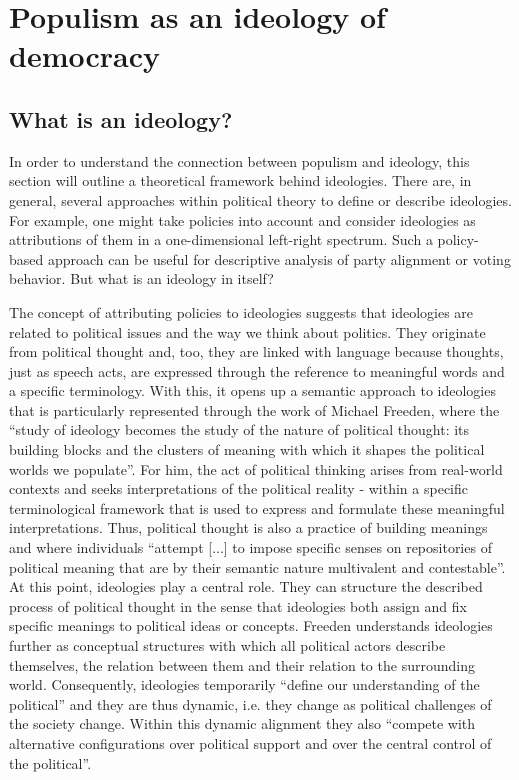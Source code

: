 \documentclass[a4paper]{scrreprt}
\begin{document}
\chapter{Populism as an ideology of democracy}
\section{What is an ideology?}
In order to understand the connection between populism and ideology, this section will outline a theoretical framework behind ideologies. There are, in general, several approaches within political theory to define or describe ideologies. For example, one might take policies into account and consider ideologies as attributions of them in a one-dimensional left-right spectrum. Such a policy-based approach can be useful for descriptive analysis of party alignment or voting behavior. \citep[p.~154]{lembcke:2014} But what is an ideology in itself?\par
The concept of attributing policies to ideologies suggests that ideologies are related to political issues and the way we think about politics. They originate from political thought and, too, they are linked with language because thoughts, just as speech acts, are expressed through the reference to meaningful words and a specific terminology. With this, it opens up a semantic approach to ideologies that is particularly represented through the work of Michael Freeden, where the ``study of ideology becomes the study of the nature of political thought: its building blocks and the clusters of meaning with which it shapes the political worlds we populate''. \cite[p.~15]{freeden:2006} For him, the act of political thinking arises from real-world contexts and seeks interpretations of the political reality - within a specific terminological framework that is used to express and formulate these meaningful interpretations. Thus, political thought is also a practice of building meanings and where individuals ``attempt [...] to impose specific senses on repositories of political meaning that are by their semantic nature multivalent and contestable''. \cite[p.~19]{freeden:2006} At this point, ideologies play a central role. They can structure the described process of political thought in the sense that ideologies both assign and fix specific meanings to political ideas or concepts. Freeden understands ideologies further as conceptual structures with which all political actors describe themselves, the relation between them and their relation to the surrounding world. Consequently, ideologies temporarily ``define our understanding of the political'' and they are thus dynamic, i.e. they change as political challenges of the society change. Within this dynamic alignment they also ``compete with alternative configurations over political support and over the central control of the political''. \cite[p.~14]{freeden:2006}\par
\end{document}

